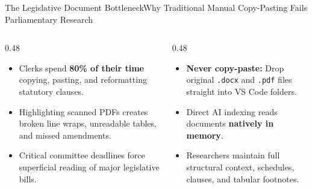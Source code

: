 \documentclass[aspectratio=169, 10pt]{beamer}
\begin{document}
\begin{frame}{The Legislative Document Bottleneck}{Why Traditional Manual Copy-Pasting Fails Parliamentary Research}
  \begin{columns}[c]
    \begin{column}{0.48\textwidth}
      \begin{tcolorbox}[colback=lightgrey, colframe=tanzaniablue, arc=1.5mm, boxrule=0.8pt, title=\textbf{The Manual Reality}]
        \small
        \begin{itemize}
          \item Clerks spend \textcolor{tanzaniablue}{\textbf{80\% of their time}} copying, pasting, and reformatting statutory clauses.
          \item Highlighting scanned PDFs creates broken line wraps, unreadable tables, and missed amendments.
          \item Critical committee deadlines force superficial reading of major legislative bills.
        \end{itemize}
      \end{tcolorbox}
    \end{column}
    \begin{column}{0.48\textwidth}
      \begin{tcolorbox}[colback=calloutbg, colframe=suagreen, arc=1.5mm, boxrule=0.8pt, title=\textbf{The Zero-Copy Paradigm}]
        \small
        \begin{itemize}
          \item \textcolor{suagreen}{\textbf{Never copy-paste:}} Drop original \texttt{.docx} and \texttt{.pdf} files straight into VS Code folders.
          \item Direct AI indexing reads documents \textcolor{tanzaniablue}{\textbf{natively in memory}}.
          \item Researchers maintain full structural context, schedules, clauses, and tabular footnotes.
        \end{itemize}
      \end{tcolorbox}
    \end{column}
  \end{columns}
\end{frame}
\end{document}
